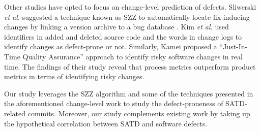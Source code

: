 Other studies have opted to focus on change-level prediction of defects. Sliwerski  \emph{et al.} suggested a technique known as SZZ to automatically locate fix-inducing changes by linking a version archive to a bug database \cite{Sliwerski-fse-2005}.   Kim \emph{et al.} \cite{Kim-tse-2008} used identifiers in added and deleted source code and the words in change logs to identify changes as defect-prone or not. Similarly,  Kamei \cite{Kamei-tse-2013} proposed a  ``Just-In-Time Quality Assurance''  approach to identify risky software changes in real time.  The findings of their study reveal that process metrics outperform product metrics in terms of identifying risky changes.

Our study leverages the SZZ algorithm and some of the techniques presented in the aforementioned change-level work to study the defect-proneness of SATD-related commits. Moreover, our study complements existing work by taking up the hypothetical correlation between SATD and software defects.
